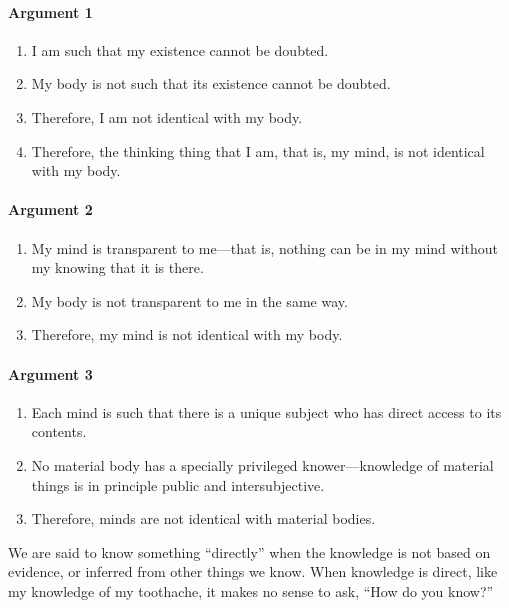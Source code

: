 \documentclass[]{article}
\begin{document}
\paragraph{Argument 1}\label{argument-1}

\begin{enumerate}
\def\labelenumi{\arabic{enumi}.}
\itemsep1pt\parskip0pt
\item
  I am such that my existence cannot be doubted.
\item
  My body is not such that its existence cannot be doubted.
\item
  Therefore, I am not identical with my body.
\item
  Therefore, the thinking thing that I am, that is, my mind, is not
  identical with my body.
\end{enumerate}

\paragraph{Argument 2}\label{argument-2}

\begin{enumerate}
\def\labelenumi{\arabic{enumi}.}
\itemsep1pt\parskip0pt
\item
  My mind is transparent to me---that is, nothing can be in my mind
  without my knowing that it is there.
\item
  My body is not transparent to me in the same way.
\item
  Therefore, my mind is not identical with my body.
\end{enumerate}

\paragraph{Argument 3}\label{argument-3}

\begin{enumerate}
\def\labelenumi{\arabic{enumi}.}
\itemsep1pt\parskip0pt
\item
  Each mind is such that there is a unique subject who has direct access
  to its contents.
\item
  No material body has a specially privileged knower---knowledge of
  material things is in principle public and intersubjective.
\item
  Therefore, minds are not identical with material bodies.
\end{enumerate}

We are said to know something ``directly'' when the knowledge is not
based on evidence, or inferred from other things we know. When knowledge
is direct, like my knowledge of my toothache, it makes no sense to ask,
``How do you know?''
\end{document}
